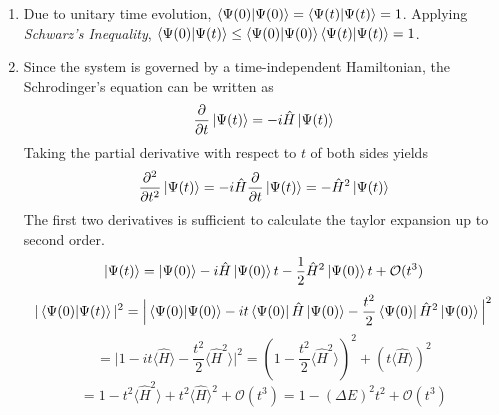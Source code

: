 \begin{sol}
\begin{enumerate}[label=\textbf{(\alph*)}]
\item
Due to unitary time evolution, $\braket{\Psi(0)}{\Psi(0)}=\braket{\Psi(t)}{\Psi(t)}=1$. Applying \textit{Schwarz's Inequality}, $\braket{\Psi(0)}{\Psi(t)}\leq\braket{\Psi(0)}{\Psi(0)}\braket{\Psi(t)}{\Psi(t)}=1$. 
\item
Since the system is governed by a time-independent Hamiltonian, the Schrodinger's equation can be written as
$$\frac{\partial}{\partial t}\ket {\Psi(t)}=-i\hat H\ket{\Psi(t)}$$
Taking the partial derivative with respect to $t$ of both sides yields
$$\frac{\partial^2}{\partial t^2}\ket{\Psi(t)}=-i\hat H\frac{\partial}{\partial t}\ket{\Psi(t)}=-\hat H^2\ket{\Psi(t)}$$
The first two derivatives is sufficient to calculate the taylor expansion up to second order.
$$\ket{\Psi(t)}=\ket{\Psi(0)}-i\hat H\ket{\Psi(0)}t-\frac{1}{2}\hat H^2\ket{\Psi(0)}t+\mathcal O(t^3)$$
$$|\braket{\Psi(0)}{\Psi(t)}|^2=\Big|\braket{\Psi(0)}{\Psi(0)}-it\bra{\Psi(0)}\hat H\ket{\Psi(0)}-\frac{t^2}{2}\bra{\Psi(0)}\hat H^2\ket{\Psi(0)}\Big|^2$$
$$=\Big|1-it\langle\hat H\rangle-\frac{t^2}{2}\langle \hat H^2\rangle\Big|^2=\left(1-\frac{t^2}{2}\langle \hat H^2\rangle\right)^2+(t\langle\hat H\rangle)^2$$$$=1-t^2\langle \hat H^2\rangle+t^2\langle\hat H\rangle^2+\mathcal{O}(t^3)=1-(\Delta E)^2t^2+\mathcal{O}(t^3)$$
\end{enumerate}
\end{sol}